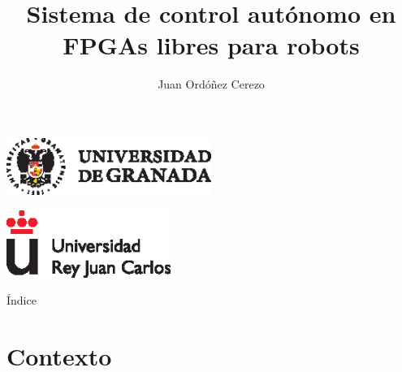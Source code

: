 \documentclass{beamer}
\title{Sistema de control autónomo en FPGAs libres para robots}
\subtitle{}
\author{Juan Ordóñez Cerezo}
\institute[Universidad de Granada] %
{
  Universidad de Granada
}
\date{}
\begin{document}
\begin{frame}[plain]
  \begin{center}
  \includegraphics [width =0.5\textwidth ]{logo_ugr}
  \end{center}
    \begin{center}
	\includegraphics [width =0.4\textwidth ]{logo_rey}
	\end{center}
  \titlepage
\end{frame}
\addtocounter{framenumber}{-1}

\begin{frame}{Índice}
  \tableofcontents
\end{frame}

\section{Contexto}
\end{document}
